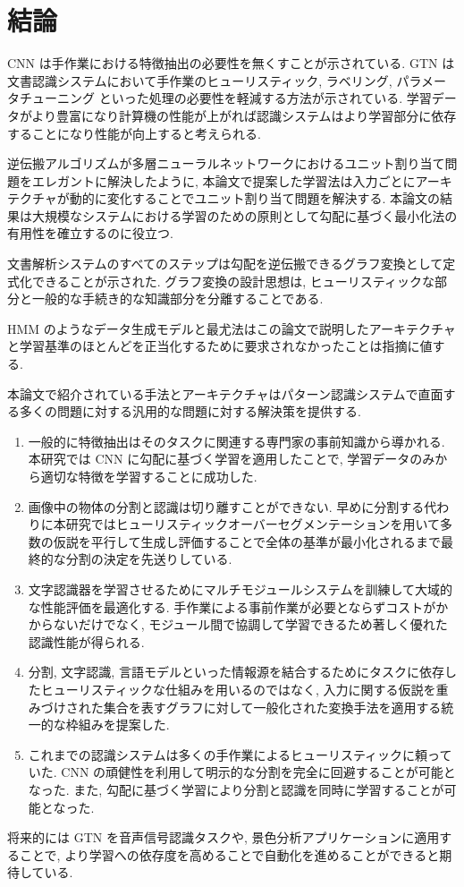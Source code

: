 \documentclass[twocolumn]{jarticle}     %
\begin{document}
\section{結論}
CNN は手作業における特徴抽出の必要性を無くすことが示されている. GTN は文書認識システムにおいて手作業のヒューリスティック, ラベリング, パラメータチューニング といった処理の必要性を軽減する方法が示されている. 学習データがより豊富になり計算機の性能が上がれば認識システムはより学習部分に依存することになり性能が向上すると考えられる. 
\par
逆伝搬アルゴリズムが多層ニューラルネットワークにおけるユニット割り当て問題をエレガントに解決したように, 本論文で提案した学習法は入力ごとにアーキテクチャが動的に変化することでユニット割り当て問題を解決する. 本論文の結果は大規模なシステムにおける学習のための原則として勾配に基づく最小化法の有用性を確立するのに役立つ.\par
文書解析システムのすべてのステップは勾配を逆伝搬できるグラフ変換として定式化できることが示された. グラフ変換の設計思想は, ヒューリスティックな部分と一般的な手続き的な知識部分を分離することである. \par
HMM のようなデータ生成モデルと最尤法はこの論文で説明したアーキテクチャと学習基準のほとんどを正当化するために要求されなかったことは指摘に値する.
\par
本論文で紹介されている手法とアーキテクチャはパターン認識システムで直面する多くの問題に対する汎用的な問題に対する解決策を提供する.
\begin{enumerate}
  \item 一般的に特徴抽出はそのタスクに関連する専門家の事前知識から導かれる. 本研究では CNN に勾配に基づく学習を適用したことで, 学習データのみから適切な特徴を学習することに成功した.
  \item 画像中の物体の分割と認識は切り離すことができない. 早めに分割する代わりに本研究ではヒューリスティックオーバーセグメンテーションを用いて多数の仮説を平行して生成し評価することで全体の基準が最小化されるまで最終的な分割の決定を先送りしている.
  \item 文字認識器を学習させるためにマルチモジュールシステムを訓練して大域的な性能評価を最適化する. 手作業による事前作業が必要とならずコストがかからないだけでなく, モジュール間で協調して学習できるため著しく優れた認識性能が得られる.
  \item 分割, 文字認識, 言語モデルといった情報源を結合するためにタスクに依存したヒューリスティックな仕組みを用いるのではなく, 入力に関する仮説を重みづけされた集合を表すグラフに対して一般化された変換手法を適用する統一的な枠組みを提案した. 
  \item これまでの認識システムは多くの手作業によるヒューリスティックに頼っていた. CNN の頑健性を利用して明示的な分割を完全に回避することが可能となった. また, 勾配に基づく学習により分割と認識を同時に学習することが可能となった.
\end{enumerate}
将来的には GTN を音声信号認識タスクや, 景色分析アプリケーションに適用することで, より学習への依存度を高めることで自動化を進めることができると期待している.




\end{document}
